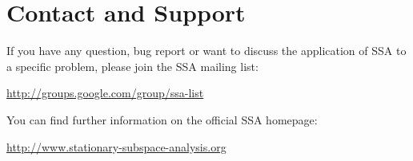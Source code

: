 \documentclass{article}
\newcommand{\1}{\ensuremath{\mathds{1}}}
\newcommand{\0}{\ensuremath{0}}
\begin{document}
\section{Contact and Support}

If you have any question, bug report or want to discuss the application of SSA
to a specific problem, please join the SSA mailing list:
\begin{center}
        \url{http://groups.google.com/group/ssa-list}
\end{center}
You can find further
information on the official SSA homepage: 
\begin{center}
	\url{http://www.stationary-subspace-analysis.org}
\end{center}

\newpage
\end{document}
